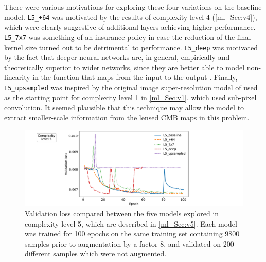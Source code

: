 There were various motivations for exploring these four variations on the baseline model. \texttt{L5\_+64} was motivated by the results of complexity level 4 (\autoref{ml_Sec:v4}), which were clearly suggestive of additional layers achieving higher performance. \texttt{L5\_7x7} was something of an insurance policy in case the reduction of the final kernel size turned out to be detrimental to performance. \texttt{L5\_deep} was motivated by the fact that deeper neural networks are, in general, empirically and theoretically superior to wider networks, since they are better able to model non-linearity in the function that maps from the input to the output \citep[e.g.][]{Safran2016, Lee2020}. Finally, \texttt{L5\_upsampled} was inspired by the original image super-resolution model of \citet{Shi2016} used as the starting point for complexity level 1 in \autoref{ml_Sec:v1}, which used sub-pixel convolution. It seemed plausible that this technique may allow the model to extract smaller-scale information from the lensed CMB maps in this problem.

\begin{figure}[tp]
\includegraphics[width=\textwidth]{v5_loss}
\caption{Validation loss compared between the five models explored in complexity level 5, which are described in \autoref{ml_Sec:v5}. Each model was trained for 100 epochs on the same training set containing 9800 samples prior to augmentation by a factor 8, and validated on 200 different samples which were not augmented.}
\label{ml_Fig:v5_loss}
\end{figure}

